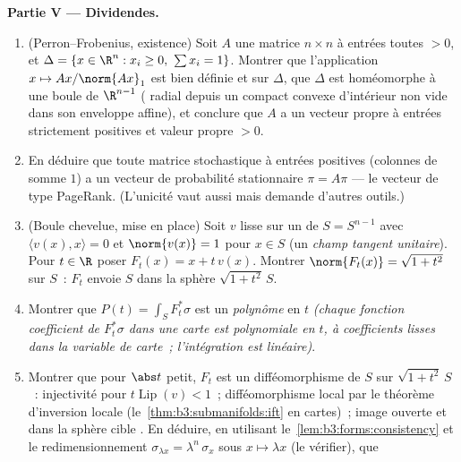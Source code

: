 \begin{problem}
\medskip
\noindent\textbf{Partie V --- Dividendes.}
\begin{enumerate}[resume]
  \item (Perron--Frobenius, existence) Soit $A$ une matrice
        $n\times n$ à entrées toutes $> 0$, et $\Delta =
        \{x \in \R^n : x_i \geq 0,\ \sum x_i = 1\}$.
        Montrer que l'application $x \mapsto
        Ax/\norm{Ax}_1$ est bien définie et  sur
        $\Delta$, que $\Delta$ est homéomorphe à une boule
         de $\R^{n-1}$ ( radial depuis un
        compact convexe d'intérieur non vide dans son
        enveloppe affine), et conclure que $A$ a un vecteur
        propre à entrées strictement positives et valeur
        propre $> 0$.
  \item En déduire que toute matrice stochastique à entrées
        positives (colonnes de somme $1$) a un vecteur de
        probabilité stationnaire $\pi = A\pi$ --- le
        vecteur de type PageRank. (L'unicité vaut aussi mais
        demande d'autres outils.)
  \item (Boule chevelue, mise en place) Soit $v$ lisse sur un
         de $S = S^{n-1}$ avec $\langle v(x),
        x\rangle = 0$ et $\norm{v(x)} = 1$ pour $x \in S$
        (un \emph{champ tangent unitaire}). Pour $t \in \R$
        poser $F_t(x) = x + t\,v(x)$. Montrer
        $\norm{F_t(x)} = \sqrt{1 + t^2}$ sur $S$~: $F_t$
        envoie $S$ dans la sphère $\sqrt{1+t^2}\,S$.
  \item Montrer que $P(t) = \int_SF_t^*\sigma$ est un
        \emph{polynôme} en $t$ \emph{(chaque fonction
        coefficient de $F_t^*\sigma$ dans une carte est
        polynomiale en $t$, à coefficients lisses dans la
        variable de carte~; l'intégration est linéaire)}.
  \item Montrer que pour $\abs t$ petit, $F_t$ est un
        difféomorphisme de $S$ sur $\sqrt{1+t^2}\,S$~:
        injectivité pour $t\operatorname{Lip}(v) < 1$~;
        difféomorphisme local par le théorème d'inversion
        locale (le~\cref{thm:b3:submanifolds:ift} en cartes)~;
        image ouverte et  dans la sphère cible
        . En déduire, en utilisant
        le~\cref{lem:b3:forms:consistency} et le
        redimensionnement $\sigma_{\lambda x} =
        \lambda^{n}\,\sigma_x$ sous $x \mapsto \lambda x$
        (le vérifier), que

\end{enumerate}
\end{problem}
